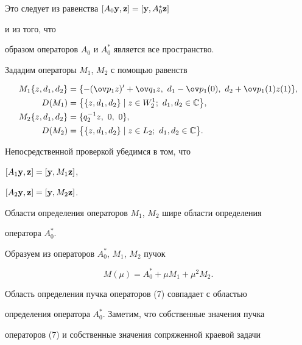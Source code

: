 Это следует из равенства $[A_0\bold y,\bold z]=[\bold y,A^*_0\bold z]$ 


и из того, что  


образом операторов $A_0$ и $A_0^*$ является все пространство.  


 


Зададим операторы $M_1$, $M_2$ с помощью равенств 


\begin{align*} 


M_1\{z,d_1,d_2\}&=\{-(\ov p_1z)'+\ov q_1z,\ d_1-\ov p_1(0), 


\ d_2+\ov p_1(1)z(1)\},\\ 


% 


D(M_1)&=\big\{\{z, d_1, d_2\}\mid z\in W^1_2;\ d_1,d_2\in\Bbb C\big\},\\ 


% 


M_2\{z,d_1,d_2\}&=\{q^{-1}_2z,\ 0,\ 0\},\\ 


% 


D(M_2)&=\big\{\{z,d_1,d_2\}\mid z\in L_2;\ d_1,d_2\in\Bbb C\big\}. 


\end{align*} 


Непосредственной проверкой убедимся в том, что 


$[A_1\bold y,\bold z]=[\bold y,M_1\bold z]$, 


$[A_2\bold y,\bold z]=[\bold y,M_2\bold z]$. 


Области определения операторов $M_1$, $M_2$ шире области определения  


оператора $A^*_0$.  


 


Образуем из операторов $A^*_0$, $M_1$, $M_2$ пучок  


\begin{equation} 


M(\mu)=A^*_0+\mu M_1+\mu^2M_2. 


\end{equation} 


Область определения пучка операторов (7) совпадает с областью  


определения оператора $A^*_0$. Заметим, что собственные значения пучка  


операторов (7) и собственные значения сопряженной краевой задачи  


